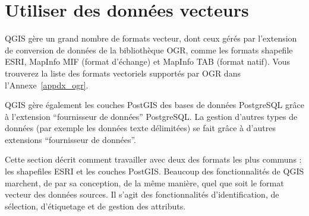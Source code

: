 
\section{Utiliser des donn\'ees vecteurs}\label{label_workingvector}



QGIS g\`ere un grand nombre de formats vecteur, dont ceux g\'er\'es par l'extension de conversion de donn\'ees de la biblioth\`eque OGR, comme les formats shapefile ESRI, MapInfo MIF (format d'\'echange) et  MapInfo TAB (format natif).
Vous trouverez la liste des formats vectoriels support\'es par OGR dans l'Annexe~\ref{appdx_ogr}.

QGIS g\`ere \'egalement les couches PostGIS des bases de donn\'ees PostgreSQL gr\^ace \`a l'extension ``fournisseur de donn\'ees'' PostgreSQL. La gestion d'autres types de donn\'ees (par exemple les donn\'ees texte d\'elimit\'ees) se fait gr\^ace \`a d'autres extensions ``fournisseur de donn\'ees''.

Cette section d\'ecrit comment travailler avec deux des formats les plus communs : les shapefiles ESRI et les couches PostGIS. Beaucoup des fonctionnalit\'es de QGIS marchent, de par sa conception, de la m\^eme mani\`ere, quel que soit le format vecteur des donn\'ees sources. Il s'agit des fonctionnalit\'es d'identification, de s\'election, d'\'etiquetage et de gestion des attributs.

